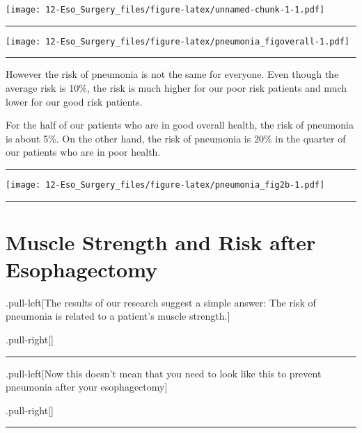 \documentclass[
]{article}
\begin{document}
\texttt{[image: 12-Eso\_Surgery\_files/figure-latex/unnamed-chunk-1-1.pdf]}

\begin{center}\rule{0.5\linewidth}{0.5pt}\end{center}

\texttt{[image: 12-Eso\_Surgery\_files/figure-latex/pneumonia\_figoverall-1.pdf]}

\begin{center}\rule{0.5\linewidth}{0.5pt}\end{center}

However the risk of pneumonia is not the same for everyone. Even though
the average risk is 10\%, the risk is much higher for our poor risk
patients and much lower for our good risk patients.

For the half of our patients who are in good overall health, the risk of
pneumonia is about 5\%. On the other hand, the risk of pneumonia is 20\%
in the quarter of our patients who are in poor health.

\begin{center}\rule{0.5\linewidth}{0.5pt}\end{center}

\texttt{[image: 12-Eso\_Surgery\_files/figure-latex/pneumonia\_fig2b-1.pdf]}

\begin{center}\rule{0.5\linewidth}{0.5pt}\end{center}

\hypertarget{muscle-strength-and-risk-after-esophagectomy}{%
\section{Muscle Strength and Risk after
Esophagectomy}\label{muscle-strength-and-risk-after-esophagectomy}}

.pull-left{[}The results of our research suggest a simple answer: The
risk of pneumonia is related to a patient's muscle strength.{]}

.pull-right{[}{]}

\begin{center}\rule{0.5\linewidth}{0.5pt}\end{center}

.pull-left{[}Now this doesn't mean that you need to look like this to
prevent pneumonia after your esophagectomy{]}

.pull-right{[}{]}

\begin{center}\rule{0.5\linewidth}{0.5pt}\end{center}
\end{document}
